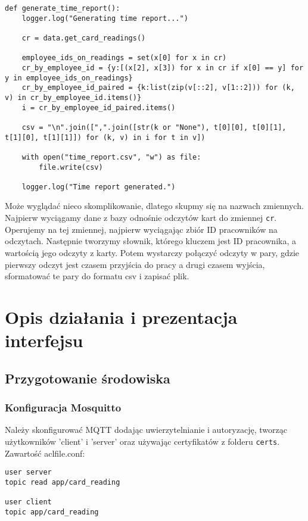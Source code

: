 \documentclass[12pt,a4paper]{article}
\begin{document}
\begin{verbatim}
def generate_time_report():
    logger.log("Generating time report...")

    cr = data.get_card_readings()

    employee_ids_on_readings = set(x[0] for x in cr)
    cr_by_employee_id = {y:[(x[2], x[3]) for x in cr if x[0] == y] for y in employee_ids_on_readings}
    cr_by_employee_id_paired = {k:list(zip(v[::2], v[1::2])) for (k, v) in cr_by_employee_id.items()}
    i = cr_by_employee_id_paired.items()

    csv = "\n".join([",".join([str(k or "None"), t[0][0], t[0][1], t[1][0], t[1][1]]) for (k, v) in i for t in v])

    with open("time_report.csv", "w") as file:
        file.write(csv)

    logger.log("Time report generated.")
\end{verbatim}
Może wyglądać nieco skomplikowanie, dlatego skupmy się na nazwach zmiennych.\\
Najpierw wyciągamy dane z bazy odnośnie odczytów kart do zmiennej \texttt{cr}.
Operujemy na tej zmiennej, najpierw wyciągając zbiór ID pracowników na odczytach.
Następnie tworzymy słownik, którego kluczem jest ID pracownika, a wartością jego odczyty z karty.
Potem wystarczy połączyć odczyty w pary, gdzie pierwszy odczyt jest czasem przyjścia do pracy a drugi czasem wyjścia, sformatować te pary do formatu csv i zapisać plik.

\section{Opis działania i prezentacja interfejsu}
\subsection{Przygotowanie środowiska}
\subsubsection{Konfiguracja Mosquitto}
Należy skonfigurować MQTT dodając uwierzytelnianie i autoryzację, tworząc użytkowników 'client' i 'server' oraz używając certyfikatów z folderu \texttt{certs}.\\

Zawartość aclfile.conf:

\begin{verbatim}
user server
topic read app/card_reading

user client
topic app/card_reading
\end{verbatim}
\end{document}
